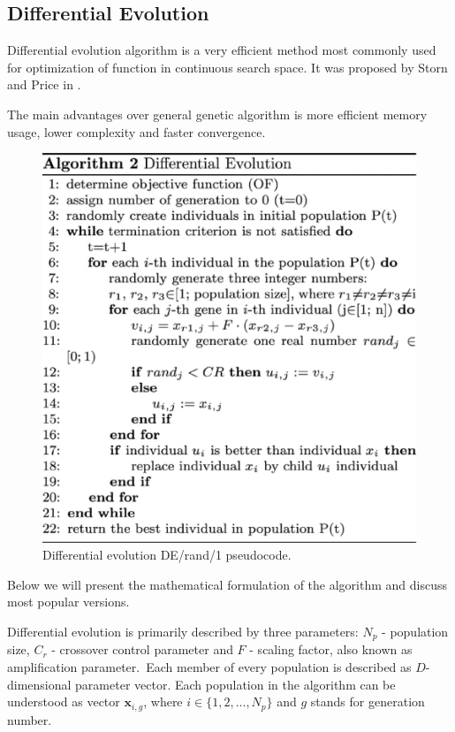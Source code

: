 \documentclass[12pt,a4paper,openany]{book}
\begin{document}
\subsection{Differential Evolution}

\noindent Differential evolution algorithm is a very efficient method most commonly used for optimization of function in continuous search space. It was proposed by Storn and Price in \cite{de}.

\noindent The main advantages over general genetic algorithm is more efficient memory usage, lower complexity and faster convergence.

 \begin{figure}[ht!]
     \centering
     \includegraphics[scale=0.5]{figs/diff-evo.eps}
     \caption{Differential evolution DE/rand/1 pseudocode.}\label{Fig:PROGAN}
 \end{figure}

\noindent Below we will present the mathematical formulation of the algorithm and discuss most popular versions.

\noindent Differential evolution is primarily described by three parameters: $N_{p}$ - population size, $C_{r}$ - crossover control parameter and $F$ - scaling factor, also known as amplification parameter.\
Each member of every population is described as $D$-dimensional parameter vector. Each population in the algorithm can be understood as vector $\textbf{x}_{i, g}$, where $i \in \{1, 2, ..., N_{p}\}$ and $g$ stands for generation number.
\end{document}
